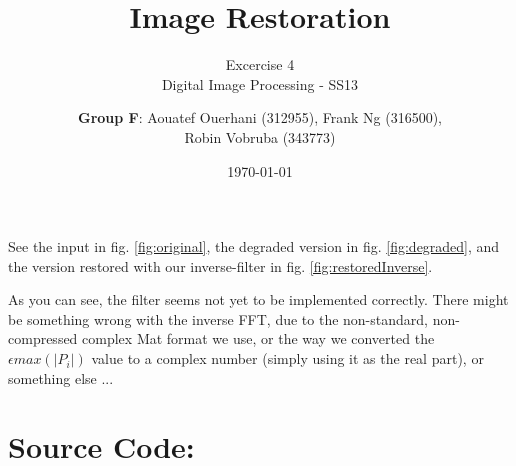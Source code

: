 \documentclass[a4paper,headings=small]{scrartcl}
\title{Image Restoration}
\subtitle{Excercise 4 \\ Digital Image Processing - SS13}
\author{\textbf{Group F}: Aouatef Ouerhani (312955), Frank Ng (316500),\\ Robin Vobruba (343773)}
\date{\today}
\numberwithin{equation}{section} %
\numberwithin{figure}{section}   %
\newcommand{\imgGeneratedRoot}{../../../target}
\begin{document}
\maketitle


See the input in fig. \ref{fig:original},
the degraded version in fig. \ref{fig:degraded},
and the version restored with our inverse-filter in fig. \ref{fig:restoredInverse}.

As you can see,
the filter seems not yet to be implemented correctly.
There might be something wrong with the inverse FFT,
due to the non-standard, non-compressed complex Mat format we use,
or the way we converted the $\epsilon max(|P_i|)$ value to a complex number
(simply using it as the real part), or something else ...


\begin{figure}[ht]
	\centering


	\label{fig:images}
\end{figure}


\newpage
\section{Source Code:}


\end{document}
